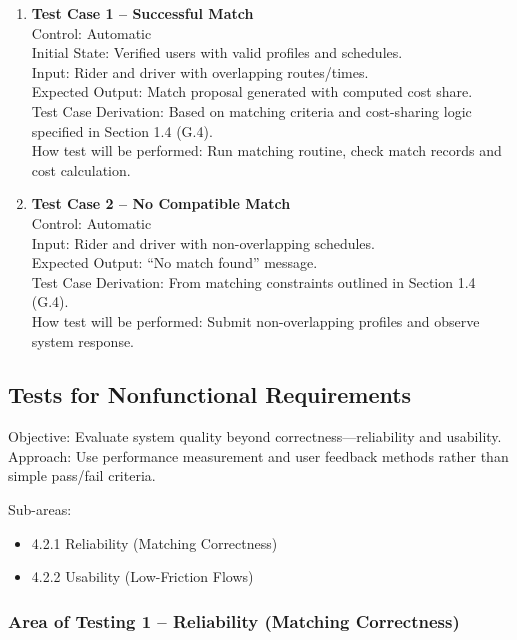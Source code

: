 \documentclass[12pt, titlepage]{article}
\begin{document}
\begin{enumerate}
\item \textbf{Test Case 1 – Successful Match}\\
Control: Automatic\\
Initial State: Verified users with valid profiles and schedules.\\
Input: Rider and driver with overlapping routes/times.\\
Expected Output: Match proposal generated with computed cost share.\\
Test Case Derivation: Based on matching criteria and cost-sharing logic specified in Section 1.4 (G.4).\\
How test will be performed: Run matching routine, check match records and cost calculation.\\[5pt]

\item \textbf{Test Case 2 – No Compatible Match}\\
Control: Automatic\\
Input: Rider and driver with non-overlapping schedules.\\
Expected Output: “No match found” message.\\
Test Case Derivation: From matching constraints outlined in Section 1.4 (G.4).\\
How test will be performed: Submit non-overlapping profiles and observe system response.\\
\end{enumerate}

\subsection{Tests for Nonfunctional Requirements}

Objective: Evaluate system quality beyond correctness—reliability and usability.  
Approach: Use performance measurement and user feedback methods rather than simple pass/fail criteria.

Sub-areas:
\begin{itemize}
    \item 4.2.1 Reliability (Matching Correctness)
    \item 4.2.2 Usability (Low-Friction Flows)
\end{itemize}

\subsubsection{Area of Testing 1 – Reliability (Matching Correctness)}
\end{document}
